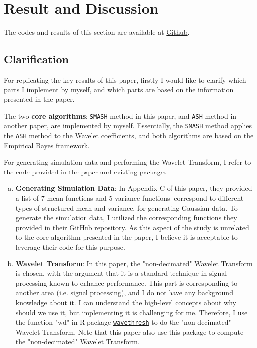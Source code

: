 \documentclass[11pt]{article}
\begin{document}



\section{Result and Discussion}

The codes and results of this section are available at \href{https://github.com/Hrzzzzz/MATH5472_Final_Project/tree/main}{Github}.

\subsection{Clarification}

For replicating the key results of this paper, firstly I would like to clarify which parts I implement by myself, and which parts are based on the information presented in the paper.

The two \textbf{core algorithms}: \verb|SMASH| method \cite{Xing} in this paper, and \verb|ASH| method \cite{Stephens} in another paper, are implemented by myself. Essentially, the \verb|SMASH| method applies the \verb|ASH| method to the Wavelet coefficients, and both algorithms are based on the Empirical Bayes framework.

For generating simulation data and performing the Wavelet Transform, I refer to the code provided in the paper and existing packages. 
\begin{enumerate}[a)]
\item \textbf{Generating Simulation Data}: In Appendix C of this paper, they provided a list of 7 mean functions and 5 variance functions, correspond to different types of structured mean and variance, for generating Gaussian data. To generate the simulation data, I utilized the corresponding functions they provided in their GitHub repository. As this aspect of the study is unrelated to the core algorithm presented in the paper, I believe it is acceptable to leverage their code for this purpose.
\item \textbf{Wavelet Transform}: In this paper, the "non-decimated" Wavelet Transform is chosen, with the argument that it is a standard technique in signal processing known to enhance performance. This part is corresponding to another area (i.e. signal processing), and I do not have any background knowledge about it. I can understand the high-level concepts about why should we use it, but implementing it is challenging for me. Therefore, I use the function "wd" in R package \href{https://cran.r-project.org/web/packages/wavethresh/wavethresh.pdf}{\texttt{wavethresh}} to do the "non-decimated" Wavelet Transform. Note that this paper also use this package to compute the "non-decimated" Wavelet Transform.
\end{enumerate} 
\end{document}
